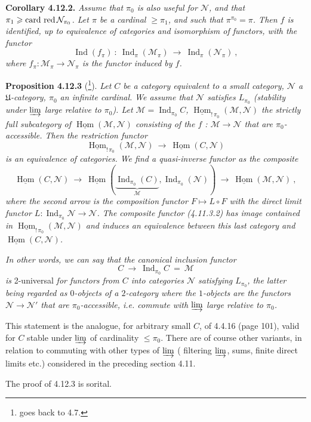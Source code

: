 \documentclass[11pt]{article}
\newcommand{\msp}[1]{\marginpar{\footnotesize [#1]}}
\newcommand{\cardred}{\operatorname{card}\,\text{\upshape red}\,}
\newcommand{\Hom}{\underline{\operatorname{Hom}}}
\newcommand{\Ind}{\operatorname{Ind}}
\begin{document}
\textbf{Corollary 4.12.2.} \textit{Assume that $\pi_0$ is also useful for $\mathcal{N}$, and that $\pi_1 \geqslant \cardred \mathcal{N}_{\pi_0}$. Let $\pi$ be a cardinal $\geqslant \pi_1$, and such that $\pi^{\pi_0} = \pi$. Then $f$ is identified, up to equivalence of categories and isomorphism of functors, with the functor}
\[
\Ind(f_\pi) \ : \ \Ind_\pi(\mathcal{M}_\pi) \ \longrightarrow \ \Ind_\pi(\mathcal{N}_\pi) \ ,
\]
\textit{where $f_\pi : \mathcal{M}_\pi \longrightarrow \mathcal{N}_\pi$ is the functor induced by $f$.}

\textbf{Proposition 4.12.3} (\footnote{goes back to 4.7.}). \textit{Let $C$ be a category equivalent to a small category, $\mathcal{N}$ a $\mathfrak{U}$-category, $\pi_0$ an infinite cardinal.} \msp{page 276} \textit{We assume that $\mathcal{N}$ satisfies $L_{\pi_0}$ (stability under $\varinjlim$ large relative to $\pi_0$). Let $\mathcal{M} = \Ind_{\pi_0} C$, $\Hom_{!\,\pi_0}(\mathcal{M},\mathcal{N})$ the strictly full subcategory of $\Hom(\mathcal{M},\mathcal{N})$ consisting of the $f$ : $\mathcal{M} \longrightarrow \mathcal{N}$ that are $\pi_0$-accessible. Then the restriction functor}
\[
\Hom_{!\,\pi_0}(\mathcal{M},\mathcal{N}) \ \longrightarrow \ \Hom(C,\mathcal{N}) \tag*{(4.12.3.1)}
\]
\textit{is an equivalence of categories. We find a quasi-inverse functor as the composite}
\[
\Hom(C,\mathcal{N}) \ \longrightarrow \ \Hom(\underbrace{\Ind_{\pi_0}(C)}_{\mathcal{M}},\Ind_{\pi_0}(\mathcal{N})) \ \longrightarrow \ \Hom(\mathcal{M},\mathcal{N}) \ , \tag*{(4.12.3.2)}
\]
\textit{where the second arrow is the composition functor $F \longmapsto L \circ F$ with the direct limit functor $L : \Ind_{\pi_0}\mathcal{N} \longrightarrow \mathcal{N}$. The composite functor (4.11.3.2) has image contained in $\Hom_{!\,\pi_0}(\mathcal{M},\mathcal{N})$ and induces an equivalence between this last category and $\Hom(C,\mathcal{N})$.} %

\msp{page 277}

\textit{In other words, we can say that the canonical inclusion functor}
\[
C \ \longrightarrow \ \Ind_{\pi_0} C \ = \ \mathcal{M}
\]
\textit{is} 2-universal \textit{for functors from $C$ into categories $\mathcal{N}$ satisfying $L_{\pi_0}$, the latter being regarded as $0$-objects of a $2$-category where the $1$-objects are the functors $\mathcal{N} \longrightarrow \mathcal{N}'$ that are $\pi_0$-accessible, i.e. commute with $\varinjlim$ large relative to $\pi_0$.}

This statement is the analogue, for arbitrary small $C$, of 4.4.16 (page 101), valid for $C$ stable under $\varinjlim$ of cardinality $\leqslant \pi_0$. There are of course other variants, in relation to commuting with other types of $\varinjlim$ ( filtering $\varinjlim$, sums, finite direct limits etc.) considered in the preceding section 4.11.

The proof of 4.12.3 is sorital.
\end{document}
